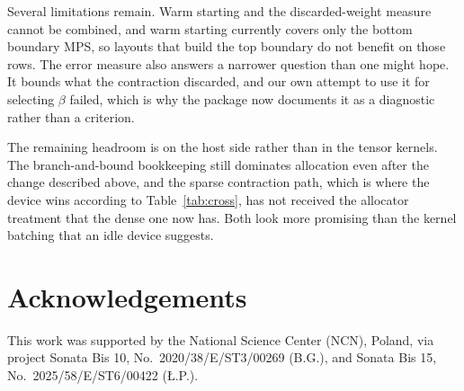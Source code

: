 \documentclass[preprint,12pt,a4paper]{elsarticle}
\begin{document}
Several limitations remain. Warm starting and the discarded-weight measure cannot be
combined, and warm starting currently covers only the bottom boundary MPS, so
layouts that build the top boundary do not benefit on those rows. The error measure
also answers a narrower question than one might hope. It bounds what the contraction
discarded, and our own attempt to use it for selecting $\beta$ failed, which is why
the package now documents it as a diagnostic rather than a criterion.

The remaining headroom is on the host side rather than in the tensor kernels. The
branch-and-bound bookkeeping still dominates allocation even after the change
described above, and the sparse contraction path, which is where the device wins
according to Table~\ref{tab:cross}, has not received the allocator treatment that
the dense one now has. Both look more promising than the kernel batching that an
idle device suggests.

\section*{Acknowledgements}
\label{acknowledgements}

This work was supported by the National Science Center (NCN), Poland, via
project Sonata Bis 10, No.~2020/38/E/ST3/00269 (B.G.), and Sonata Bis 15,
No.~2025/58/E/ST6/00422 ({\L}.P.).



\end{document}

